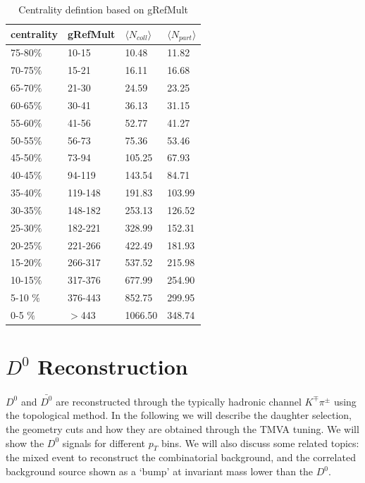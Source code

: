 \documentclass[a4paper]{article}
\begin{document}
\begin{table}[htp]
	\begin{center}
	\begin{tabular}{l|l|l|l}
  \toprule[1.6pt]
  \hline
  centrality & gRefMult & {$\langle$$N_{coll}$$\rangle$} & {$\langle$$N_{part}$$\rangle$} \\ \hline
  75-80$\%$ &	10-15	& 10.48 &	11.82 \\ \hline
	70-75$\%$ &	15-21	&	16.11 &	16.68 \\ \hline
	65-70$\%$ &	21-30	&	24.59 &	23.25 \\ \hline
	60-65$\%$ &	30-41	&	36.13 &	31.15 \\ \hline
	55-60$\%$ &	41-56	&	52.77 &	41.27 \\ \hline
	50-55$\%$ &	56-73	&	75.36 &	53.46 \\ \hline
  45-50$\%$ &	73-94	&	105.25 & 67.93 \\ \hline
  40-45$\%$ &	94-119 & 143.54 &	84.71 \\ \hline
  35-40$\%$ &	119-148	& 191.83 & 103.99 \\ \hline
	30-35$\%$ &	148-182	& 253.13 & 126.52 \\ \hline
	25-30$\%$ &	182-221	& 328.99 & 152.31 \\ \hline
	20-25$\%$ &	221-266	& 422.49 & 181.93 \\ \hline
	15-20$\%$ &	266-317	& 537.52 & 215.98 \\ \hline
	10-15$\%$ &	317-376	& 677.99 & 254.90 \\ \hline
	5-10 $\%$ &	376-443	& 852.75 & 299.95 \\ \hline
  0-5	 $\%$	& $>$443	& 1066.50	& 348.74 \\ \hline
  \hline
  \bottomrule[1.6pt]
	\end{tabular}
	\caption{Centrality defintion based on gRefMult}
	\label{centrality}
	\end{center}
\end{table}

\section{$D^0$ Reconstruction}

$D^{0}$ and $\bar{D^{0}}$ are reconstructed through the typically hadronic channel $K^{\mp}\pi^{\pm}$ using the topological method. In the following we will describe the daughter selection, the geometry cuts and how they are obtained through the TMVA tuning. We will show the $D^0$ signals for different $p_T$ bins. We will also discuss some related topics: the mixed event to reconstruct the combinatorial background, and the correlated background source shown as a `bump' at invariant mass lower than the $D^0$. 
\end{document}
